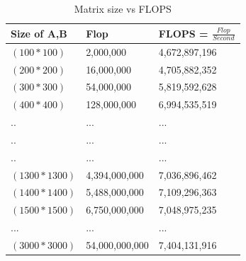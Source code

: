 \documentclass[10pts]{article}
\begin{document}
\begin{table}[htp!]
	\centering
			\begin{center}
				\begin{tabular}{| l| l |l | }
					\hline
					\textbf{Size of A,B} & \textbf{Flop} & \textbf{FLOPS = $\frac{Flop}{Second}$}  \\ 
					\hline
					$(100*100)$ &  2,000,000    &  4,672,897,196\\ 
					$(200*200)$ &  16,000,000   &  4,705,882,352\\ 
					$(300*300)$ &  54,000,000   &  5,819,592,628\\
					$(400*400)$ &  128,000,000  & 6,994,535,519\\
					..  &  ... & ...\\
					..  &  ...&...\\
					..  &  ...&...\\
					$(1300*1300)$&  4,394,000,000&7,036,896,462\\
					$(1400*1400)$&  5,488,000,000&7,109,296,363 \\
					$(1500*1500)$&  6,750,000,000&7,048,975,235\\
					...& ...& ...\\
					$(3000*3000)$&  54,000,000,000&7,404,131,916\\
					\hline
				\end{tabular} 
			\end{center}
	\caption{Matrix size vs FLOPS}
	\label{table:Matrix size vs FLOPS}
\end{table} 
\end{document}
